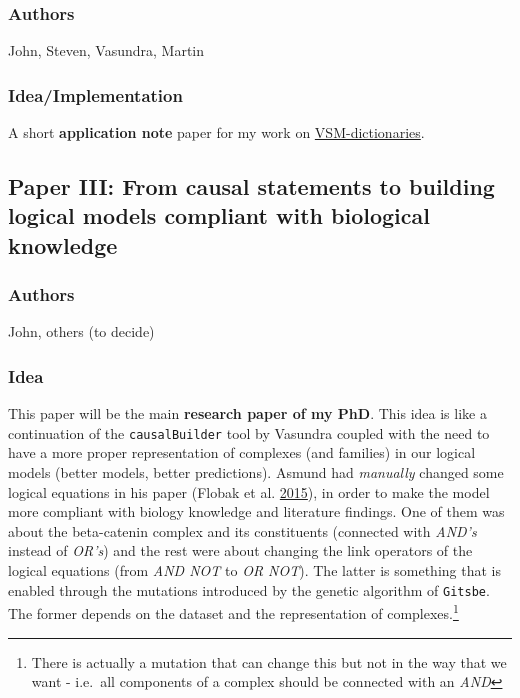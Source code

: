 \documentclass[12pt,]{book}
\let\rmarkdownfootnote\footnote%
\def\footnote{\protect\rmarkdownfootnote}
\begin{document}
\hypertarget{authors-1}{%
\subsubsection*{Authors}\label{authors-1}}

John, Steven, Vasundra, Martin

\hypertarget{ideaimplementation}{%
\subsubsection*{Idea/Implementation}\label{ideaimplementation}}

A short \textbf{application note} paper for my work on \protect\hyperlink{vsm-dict}{VSM-dictionaries}.

\hypertarget{paper-iii-from-causal-statements-to-building-logical-models-compliant-with-biological-knowledge}{%
\subsection*{Paper III: From causal statements to building logical models compliant with biological knowledge}\label{paper-iii-from-causal-statements-to-building-logical-models-compliant-with-biological-knowledge}}

\hypertarget{authors-2}{%
\subsubsection*{Authors}\label{authors-2}}

John, others (to decide)

\hypertarget{idea-1}{%
\subsubsection*{Idea}\label{idea-1}}

This paper will be the main \textbf{research paper of my PhD}.
This idea is like a continuation of the \texttt{causalBuilder} tool by Vasundra coupled with the
need to have a more proper representation of complexes (and families) in our
logical models (better models, better predictions). Asmund had \emph{manually} changed some logical equations in his paper
(Flobak et al. \protect\hyperlink{ref-Flobak2015}{2015}), in order to make the model more compliant with biology knowledge
and literature findings. One of them was about the beta-catenin complex and its
constituents (connected with \emph{AND's} instead of \emph{OR's}) and the rest were about changing the link operators of the logical
equations (from \emph{AND NOT} to \emph{OR NOT}). The latter is something that is enabled
through the mutations introduced by the genetic algorithm of \texttt{Gitsbe}. The former
depends on the dataset and the representation of complexes.\footnote{There is actually a mutation that can change this but not in the way that we want - i.e.~all components of a complex
  should be connected with an \emph{AND}}
\end{document}

